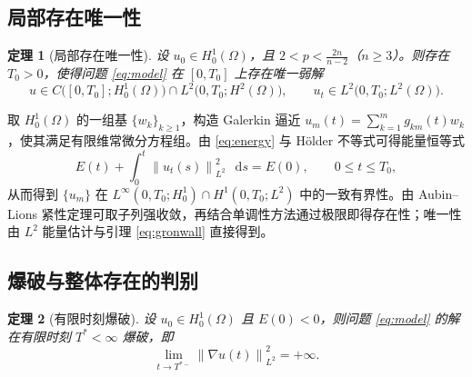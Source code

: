 \documentclass[12pt,a4paper,twoside,openright]{ctexbook}
\makeatletter
\numberwithin{figure}{chapter}
\numberwithin{table}{chapter}
\numberwithin{equation}{chapter}
\theoremstyle{ncwuthm}
\newtheorem{theorem}{定理}[chapter]
\renewcommand{\proofname}{\upshape\zihao{-4}\heiti 证明}
\renewenvironment{proof}[1][\proofname]{\par
  \pushQED{\qed}%
  \normalfont \topsep6\p@\@plus6\p@\relax
  \trivlist
  \leftskip=2\ccwd
  \item[\hskip\labelsep\itshape#1\@addpunct{.}]%
  \ignorespaces
}{%
  \popQED\endtrivlist\@endpefalse
}
\newcommand{\dif}{\mathop{}\!\mathrm{d}}
\newcommand{\norm}[1]{\left\lVert #1 \right\rVert}
\makeatother
\begin{document}
\subsection{局部存在唯一性}
\begin{theorem}[局部存在唯一性]
设 $u_0\in H^1_0(\Omega)$，且 $2<p<\frac{2n}{n-2}$（$n\geq 3$）。则存在 $T_0>0$，使得问题 \eqref{eq:model} 在 $[0,T_0]$ 上存在唯一弱解
\begin{equation}
  u \in C\bigl([0,T_0];H^1_0(\Omega)\bigr)\cap L^2\bigl(0,T_0;H^2(\Omega)\bigr) ,
  \qquad u_t\in L^2\bigl(0,T_0;L^2(\Omega)\bigr) .
  \label{eq:reg}
\end{equation}
\label{thm:local}
\end{theorem}

\begin{proof}
取 $H^1_0(\Omega)$ 的一组基 $\{w_k\}_{k\geq 1}$，构造 Galerkin 逼近
$u_m(t)=\sum_{k=1}^m g_{km}(t)w_k$，使其满足有限维常微分方程组。由 \eqref{eq:energy} 与 Hölder 不等式可得能量恒等式
\begin{equation}
  E(t) + \int_0^t \norm{u_t(s)}_{L^2}^2 \,\dif s = E(0),
  \qquad 0\leq t\leq T_0 ,
  \label{eq:energy-id}
\end{equation}
从而得到 $\{u_m\}$ 在 $L^\infty(0,T_0;H^1_0)\cap H^1(0,T_0;L^2)$ 中的一致有界性。由 Aubin--Lions 紧性定理可取子列强收敛，再结合单调性方法通过极限即得存在性；唯一性由 $L^2$ 能量估计与引理 \ref{eq:gronwall} 直接得到。
\end{proof}

\subsection{爆破与整体存在的判别}
\begin{theorem}[有限时刻爆破]
设 $u_0\in H^1_0(\Omega)$ 且 $E(0)<0$，则问题 \eqref{eq:model} 的解在有限时刻 $T^*<\infty$ 爆破，即
\begin{equation}
  \lim_{t\to T^{*-}} \norm{\nabla u(t)}_{L^2}^2 = +\infty .
  \label{eq:blowup}
\end{equation}
\label{thm:blowup}
\end{theorem}
\end{document}
